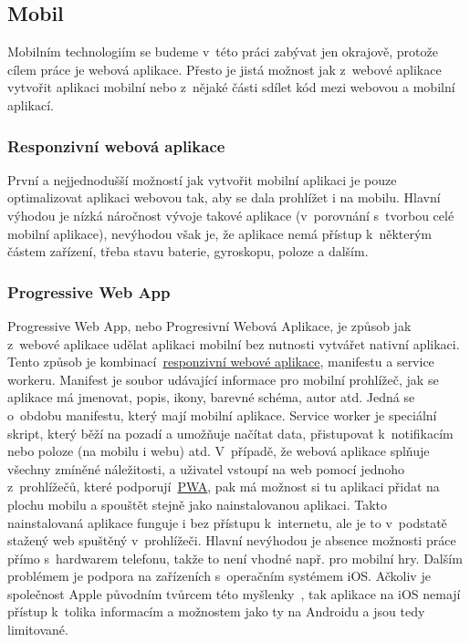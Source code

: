 \subsection{Mobil}
\label{ss:mobile}
Mobilním technologiím se budeme v~této práci zabývat jen okrajově, protože cílem práce je webová aplikace. Přesto je jistá možnost jak z~webové aplikace vytvořit aplikaci mobilní nebo z~nějaké části sdílet kód mezi webovou a mobilní aplikací.

\subsubsection*{Responzivní webová aplikace}
\label{sss:responsive_web_app}
První a nejjednodušší možností jak vytvořit mobilní aplikaci je pouze optimalizovat aplikaci webovou tak, aby se dala prohlížet i na mobilu. Hlavní výhodou je nízká náročnost vývoje takové aplikace (v~porovnání s~tvorbou celé mobilní aplikace), nevýhodou však je, že aplikace nemá přístup k~některým částem zařízení, třeba stavu baterie, gyroskopu, poloze a dalším.

\subsubsection*{Progressive Web App}
\label{sss:pwa}
Progressive Web App, nebo Progresivní Webová Aplikace, je způsob jak z~webové aplikace udělat aplikaci mobilní bez nutnosti vytvářet nativní aplikaci. Tento způsob je kombinací~\hyperref[sss:responsive_web_app]{responzivní webové aplikace}, manifestu a service workeru. Manifest je soubor udávající informace pro mobilní prohlížeč, jak se aplikace má jmenovat, popis, ikony, barevné schéma, autor atd. Jedná se o~obdobu manifestu, který mají mobilní aplikace. Service worker je speciální skript, který běží na pozadí a umožňuje načítat data, přistupovat k~notifikacím nebo poloze (na mobilu i webu) atd. V~případě, že webová aplikace splňuje všechny zmíněné náležitosti, a uživatel vstoupí na web pomocí jednoho z~prohlížečů, které podporují~\hyperref[sss:pwa]{PWA}, pak má možnost si tu aplikaci přidat na plochu mobilu a spouštět stejně jako nainstalovanou aplikaci. Takto nainstalovaná aplikace funguje i bez přístupu k~internetu, ale je to v~podstatě stažený web spuštěný v~prohlížeči. Hlavní nevýhodou je absence možnosti práce přímo s~hardwarem telefonu, takže to není vhodné např. pro mobilní hry. Dalším problémem je podpora na zařízeních s~operačním systémem iOS. Ačkoliv je společnost Apple původním tvůrcem této myšlenky~\cite{ritchie_2018_app}, tak aplikace na iOS nemají přístup k~tolika informacím a možnostem jako ty na Androidu a jsou tedy limitované.

